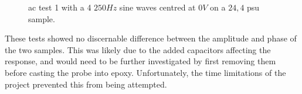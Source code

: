 \begin{figure}[ht]
\begin{minipage}{0.5\textwidth}
        \caption{\gls{ac} test 1 with a 4 $250Hz$ sine waves centred at $0V$ on a $24,4$ \gls{psu} sample.}
        \label{fig:test20} %
    \end{minipage}
\end{figure}

These tests showed no discernable difference between the amplitude and phase of the two samples.
This was likely due to the added capacitors affecting the response, and would need to be further investigated by first removing them before casting the probe into epoxy.
Unfortunately, the time limitations of the project prevented this from being attempted.
